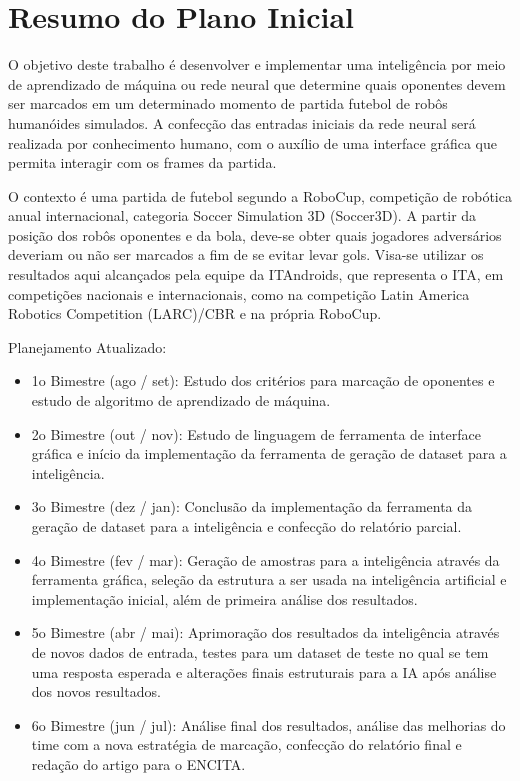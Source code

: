 \documentclass[a4paper,12pt]{article}
\begin{document}




\tableofcontents

\newpage

\section{Resumo do Plano Inicial}
\label{secao:plano_inicial}

O objetivo deste trabalho é desenvolver e implementar uma inteligência por meio de aprendizado de máquina ou rede neural que determine quais oponentes devem ser marcados em um determinado momento de partida futebol de robôs humanóides simulados. A confecção das entradas iniciais da rede neural será realizada por conhecimento humano, com o auxílio de uma interface gráfica que permita interagir com os frames da partida. 

O contexto é uma partida de futebol segundo a RoboCup, competição de robótica anual internacional, categoria Soccer Simulation 3D (Soccer3D). A partir da posição dos robôs oponentes e da bola, deve-se obter quais jogadores adversários deveriam ou não ser marcados a fim de se evitar levar gols. Visa-se utilizar os resultados aqui alcançados pela equipe da ITAndroids, que representa o ITA, em competições nacionais e internacionais, como na competição Latin America Robotics Competition (LARC)/CBR e na própria RoboCup.

Planejamento Atualizado:
\begin{itemize}

\item 1o Bimestre (ago / set): Estudo dos critérios para marcação de oponentes e estudo de algoritmo de aprendizado de máquina.

\item 2o Bimestre (out / nov): Estudo de linguagem de ferramenta de interface gráfica e início da implementação da ferramenta de geração de dataset para a inteligência.

\item 3o Bimestre (dez / jan): Conclusão da implementação da ferramenta da geração de dataset para a inteligência e confecção do relatório parcial.

\item 4o Bimestre (fev / mar): Geração de amostras para a inteligência através da ferramenta gráfica, seleção da estrutura a ser usada na inteligência artificial e implementação inicial, além de primeira análise dos resultados.

\item 5o Bimestre (abr / mai): Aprimoração dos resultados da inteligência através de novos dados de entrada, testes para um dataset de teste no qual se tem uma resposta esperada e alterações finais estruturais para a IA após análise dos novos resultados.

\item 6o Bimestre (jun / jul): Análise final dos resultados, análise das melhorias do time com a nova estratégia de marcação, confecção do relatório final e redação do artigo para o ENCITA.

\end{itemize}
\end{document}
